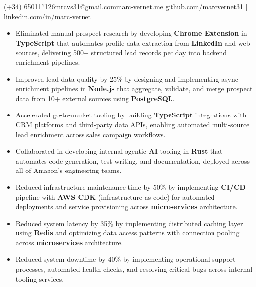 \documentclass[10pt,a4paper]{article}
\begin{document}
  {(+34) 650117126}{mrcvs31@gmail.com}{marc-vernet.me}
  {github.com/marcvernet31 \quad $|$ \quad linkedin.com/in/marc-vernet}


\begin{itemize}[topsep=0pt]
  \item Eliminated manual prospect research by developing \textbf{Chrome Extension} in \textbf{TypeScript} that automates profile data extraction from \textbf{LinkedIn} and web sources, delivering 500+ structured lead records per day into backend enrichment pipelines.
  \item Improved lead data quality by 25\% by designing and implementing async enrichment pipelines in \textbf{Node.js} that aggregate, validate, and merge prospect data from 10+ external sources using \textbf{PostgreSQL}.
  \item Accelerated go-to-market tooling by building \textbf{TypeScript} integrations with CRM platforms and third-party data APIs, enabling automated multi-source lead enrichment across sales campaign workflows.
\end{itemize}
\vspace{0.15em}

\begin{itemize}[topsep=0pt]
  \item Collaborated in developing internal agentic \textbf{AI} tooling in \textbf{Rust} that automates code generation, test writing, and documentation, deployed across all of Amazon's engineering teams.
  \item Reduced infrastructure maintenance time by 50\% by implementing \textbf{CI/CD} pipeline with \textbf{AWS CDK} (infrastructure-as-code) for automated deployments and service provisioning across \textbf{microservices} architecture.
  \item Reduced system latency by 35\% by implementing distributed caching layer using \textbf{Redis} and optimizing data access patterns with connection pooling across \textbf{microservices} architecture.
  \item Reduced system downtime by 40\% by implementing operational support processes, automated health checks, and resolving critical bugs across internal tooling services.
\end{itemize}
\vspace{0.15em}
\end{document}
